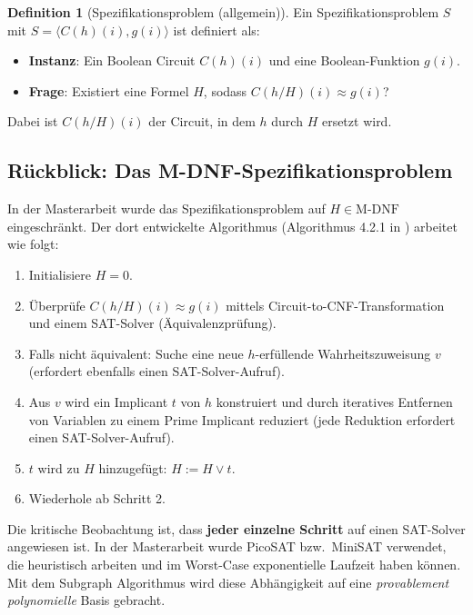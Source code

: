 ﻿\documentclass[a4paper,12pt]{article}
\theoremstyle{definition}
\newtheorem{definition}{Definition}
\begin{document}
\begin{definition}[Spezifikationsproblem (allgemein)]
    Ein Spezifikationsproblem $S$ mit $S = \langle C(h)(i), g(i) \rangle$ ist definiert als:
    \begin{itemize}
        \item \textbf{Instanz}: Ein Boolean Circuit $C(h)(i)$ und eine Boolean-Funktion $g(i)$.
        \item \textbf{Frage}: Existiert eine Formel $H$, sodass $C(h/H)(i) \approx g(i)$?
    \end{itemize}
    Dabei ist $C(h/H)(i)$ der Circuit, in dem $h$ durch $H$ ersetzt wird.
\end{definition}

\subsection{Rückblick: Das M-DNF-Spezifikationsproblem}

In der Masterarbeit \cite{Epp13} wurde das Spezifikationsproblem auf $H \in \text{M-DNF}$ eingeschränkt. Der dort entwickelte Algorithmus (Algorithmus 4.2.1 in \cite{Epp13}) arbeitet wie folgt:

\begin{enumerate}
    \item Initialisiere $H = 0$.
    \item Überprüfe $C(h/H)(i) \approx g(i)$ mittels Circuit-to-CNF-Transformation und einem SAT-Solver (Äquivalenzprüfung).
    \item Falls nicht äquivalent: Suche eine neue $h$-erfüllende Wahrheitszuweisung $v$ (erfordert ebenfalls einen SAT-Solver-Aufruf).
    \item Aus $v$ wird ein Implicant $t$ von $h$ konstruiert und durch iteratives Entfernen von Variablen zu einem Prime Implicant reduziert (jede Reduktion erfordert einen SAT-Solver-Aufruf).
    \item $t$ wird zu $H$ hinzugefügt: $H := H \lor t$.
    \item Wiederhole ab Schritt 2.
\end{enumerate}

Die kritische Beobachtung ist, dass \textbf{jeder einzelne Schritt} auf einen SAT-Solver angewiesen ist. In der Masterarbeit wurde PicoSAT \cite{Bie08} bzw.\ MiniSAT \cite{ES04} verwendet, die heuristisch arbeiten und im Worst-Case exponentielle Laufzeit haben können. Mit dem Subgraph Algorithmus wird diese Abhängigkeit auf eine \textit{provablement polynomielle} Basis gebracht.
\end{document}
